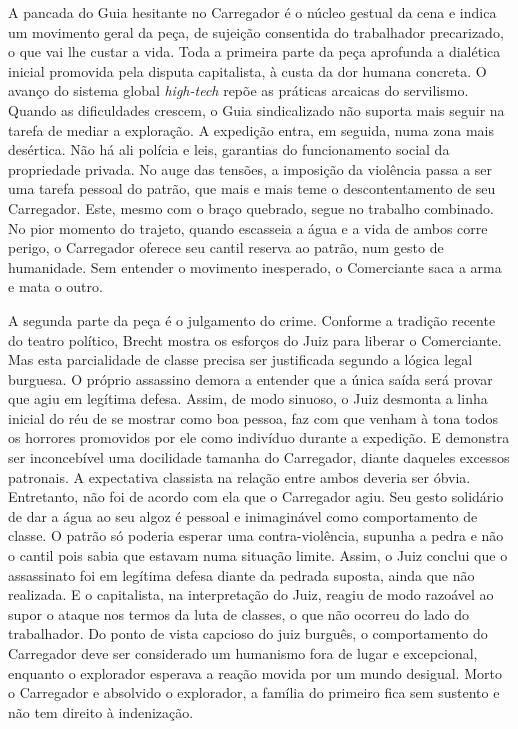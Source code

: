 A pancada do Guia hesitante no Carregador é o núcleo gestual da cena e
indica um movimento geral da peça, de sujeição consentida do trabalhador
precarizado, o que vai lhe custar a vida. Toda a primeira parte da peça
aprofunda a dialética inicial promovida pela disputa capitalista, à
custa da dor humana concreta. O avanço do sistema global {\it high-tech}
repõe as práticas arcaicas do servilismo. Quando as dificuldades
crescem, o Guia sindicalizado não suporta mais seguir na tarefa de
mediar a exploração. A expedição entra, em seguida, numa zona mais
desértica. Não há ali polícia e leis, garantias do funcionamento social
da propriedade privada. No auge das tensões, a imposição da violência
passa a ser uma tarefa pessoal do patrão, que mais e mais teme o
descontentamento de seu Carregador. Este, mesmo com o braço quebrado,
segue no trabalho combinado. No pior momento do trajeto, quando
escasseia a água e a vida de ambos corre perigo, o Carregador oferece
seu cantil reserva ao patrão, num gesto de humanidade. Sem entender o
movimento inesperado, o Comerciante saca a arma e mata o outro.

A segunda parte da peça é o julgamento do crime. Conforme a tradição
recente do teatro político, Brecht mostra os esforços do Juiz para
liberar o Comerciante. Mas esta parcialidade de classe precisa ser
justificada segundo a lógica legal burguesa. O próprio assassino demora
a entender que a única saída será provar que agiu em legítima defesa.
Assim, de modo sinuoso, o Juiz desmonta a linha inicial do réu de se
mostrar como boa pessoa, faz com que venham à tona todos os horrores
promovidos por ele como indivíduo durante a expedição. E demonstra ser
inconcebível uma docilidade tamanha do Carregador, diante daqueles
excessos patronais. A expectativa classista na relação entre ambos
deveria ser óbvia. Entretanto, não foi de acordo com ela que o
Carregador agiu. Seu gesto solidário de dar a água ao seu algoz é
pessoal e inimaginável como comportamento de classe. O patrão só poderia
esperar uma contra-violência, supunha a pedra e não o cantil pois sabia
que estavam numa situação limite. Assim, o Juiz conclui que o
assassinato foi em legítima defesa diante da pedrada suposta, ainda que
não realizada. E o capitalista, na interpretação do Juiz, reagiu de modo
razoável ao supor o ataque nos termos da luta de classes, o que não
ocorreu do lado do trabalhador. Do ponto de vista capcioso do juiz
burguês, o comportamento do Carregador deve ser considerado um humanismo
fora de lugar e excepcional, enquanto o explorador esperava a reação
movida por um mundo desigual. Morto o Carregador e absolvido o
explorador, a família do primeiro fica sem sustento e não tem direito à
indenização.

